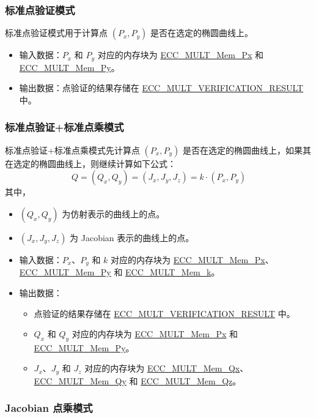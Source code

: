 \documentclass[main\_\_CN.tex]{subfiles}
\begin{document}
\subsubsection{标准点验证模式}

标准点验证模式用于计算点 $(P_x, P_y)$ 是否在选定的椭圆曲线上。

\begin{itemize}
    \item 输入数据：$P_x$ 和 $P_y$ 对应的内存块为 \hyperref[tab:ecc-memory]{ECC\_MULT\_Mem\_Px} 和 \hyperref[tab:ecc-memory]{ECC\_MULT\_Mem\_Py}。
    \item 输出数据：点验证的结果存储在 \hyperref[fielddesc:ECCMULTVERIFICATIONRESULT]{ECC\_MULT\_VERIFICATION\_RESULT} 中。
\end{itemize}

\subsubsection{标准点验证+标准点乘模式}

标准点验证+标准点乘模式先计算点 $(P_x,P_y)$ 是否在选定的椭圆曲线上，如果其在选定的椭圆曲线上，则继续计算如下公式：
\[
Q = (Q_x,Q_y) = (J_x,J_y,J_z) = k \cdot (P_x,P_y)
\]
其中，
\begin{itemize}
    \item $(Q_x,Q_y)$ 为仿射表示的曲线上的点。
    \item $(J_x,J_y,J_z)$ 为 Jacobian 表示的曲线上的点。
    \item 输入数据：$P_x$、$P_y$ 和 $k$ 对应的内存块为 \hyperref[tab:ecc-memory]{ECC\_MULT\_Mem\_Px}、\hyperref[tab:ecc-memory]{ECC\_MULT\_Mem\_Py} 和 \hyperref[tab:ecc-memory]{ECC\_MULT\_Mem\_k}。
    \item 输出数据：
    \begin{itemize}
        \item 点验证的结果存储在 \hyperref[fielddesc:ECCMULTVERIFICATIONRESULT]{ECC\_MULT\_VERIFICATION\_RESULT} 中。
        \item $Q_x$ 和 $Q_y$ 对应的内存块为 \hyperref[tab:ecc-memory]{ECC\_MULT\_Mem\_Px} 和 \hyperref[tab:ecc-memory]{ECC\_MULT\_Mem\_Py}。
        \item $J_x$、$J_y$ 和 $J_z$ 对应的内存块为 \hyperref[tab:ecc-memory]{ECC\_MULT\_Mem\_Qx}、\hyperref[tab:ecc-memory]{ECC\_MULT\_Mem\_Qy} 和 \hyperref[tab:ecc-memory]{ECC\_MULT\_Mem\_Qz}。
    \end{itemize}
\end{itemize}


\subsubsection{Jacobian 点乘模式}
\end{document}
